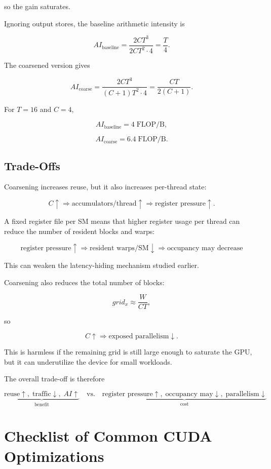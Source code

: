 \documentclass[11pt]{article}
\begin{document}
so the gain saturates.

Ignoring output stores, the baseline arithmetic intensity is

\[
AI_{\text{baseline}}
=
\frac{2CT^3}
{2CT^2\cdot 4}
=
\boxed{\frac{T}{4}}.
\]

The coarsened version gives

\[
AI_{\text{coarse}}
=
\frac{2CT^3}
{(C+1)T^2\cdot 4}
=
\boxed{
\frac{CT}{2(C+1)}
}.
\]

For \(T=16\) and \(C=4\),

\[
AI_{\text{baseline}}=4\;\text{FLOP/B},
\]

\[
AI_{\text{coarse}}=6.4\;\text{FLOP/B}.
\]

\subsection{Trade-Offs}

Coarsening increases reuse, but it also increases per-thread state:

\[
C\uparrow
\Rightarrow
\text{accumulators/thread}\uparrow
\Rightarrow
\text{register pressure}\uparrow.
\]

A fixed register file per SM means that higher register usage per thread can reduce the number of resident blocks and warps:

\[
\boxed{
\text{register pressure}\uparrow
\Rightarrow
\text{resident warps/SM}\downarrow
\Rightarrow
\text{occupancy may decrease}
}
\]

This can weaken the latency-hiding mechanism studied earlier.

Coarsening also reduces the total number of blocks:

\[
grid_x
\approx
\frac{W}{CT},
\]

so

\[
\boxed{
C\uparrow
\Rightarrow
\text{exposed parallelism}\downarrow.
}
\]

This is harmless if the remaining grid is still large enough to saturate the GPU, but it can underutilize the device for small workloads.

The overall trade-off is therefore

\[
\boxed{
\underbrace{
\text{reuse}\uparrow,\;
\text{traffic}\downarrow,\;
AI\uparrow
}_{\text{benefit}}
\quad\text{vs.}\quad
\underbrace{
\text{register pressure}\uparrow,\;
\text{occupancy may}\downarrow,\;
\text{parallelism}\downarrow
}_{\text{cost}}
}
\]

\section{Checklist of Common CUDA Optimizations}
\end{document}
